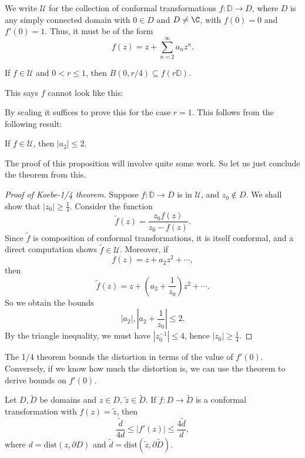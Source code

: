 \documentclass[a4paper]{article}
\renewcommand\D{\mathbb{D}}
\newcommand\dist{\mathrm{dist}}
\begin{document}
We write $\mathcal{U}$ for the collection of conformal transformations $f: \D \to D$, where $D$ is any simply connected domain with $0 \in D$ and $D \not= \C$, with $f(0) = 0$ and $f'(0) = 1$. Thus, it must be of the form
\[
  f(z) = z + \sum_{n = 2}^\infty a_n z^n.
\]
\begin{thm}
  If $f \in \mathcal{U}$ and $0 < r \leq 1$, then $B(0, r/4) \subseteq f(r\D)$.
\end{thm}
This says $f$ cannot look like this:
\begin{center}
\end{center}
By scaling it suffices to prove this for the case $r = 1$. This follows from the following result:
\begin{thm}
  If $f \in \mathcal{U}$, then $|a_2| \leq 2$.
\end{thm}
The proof of this proposition will involve quite some work. So let us just conclude the theorem from this.
\begin{proof}[Proof of Koebe-1/4 theorem]
  Suppose $f: \D \to D$ is in $\mathcal{U}$, and $z_0 \not \in D$. We shall show that $|z_0| \geq \frac{1}{4}$. Consider the function
  \[
    \tilde{f}(z) = \frac{z_0 f(z)}{z_0 - f(z)}.
  \]
  Since $\tilde{f}$ is composition of conformal transformations, it is itself conformal, and a direct computation shows $\tilde{f} \in \mathcal{U}$. Moreover, if
  \[
    f(z) = z + a_2 z^2 + \cdots,
  \]
  then
  \[
    \tilde{f}(z) = z + \left(a_2 + \frac{1}{z_0}\right)z^2 + \cdots.
  \]
  So we obtain the bounds
  \[
    |a_2|, \left|a_2 + \frac{1}{z_0}\right| \leq 2.
  \]
  By the triangle inequality, we must have $|z_0^{-1}| \leq 4$, hence $|z_0| \geq \frac{1}{4}$.
\end{proof}

The 1/4 theorem bounds the distortion in terms of the value of $f'(0)$. Conversely, if we know how much the distortion is, we can use the theorem to derive bounds on $f'(0)$.
\begin{cor}
  Let $D, \tilde{D}$ be domains and $z \in D$, $\tilde{z} \in \tilde{D}$. If $f: D \to \tilde{D}$ is a conformal transformation with $f(z) = \tilde{z}$, then
  \[
    \frac{\tilde{d}}{4d} \leq |f'(z)| \leq \frac{4\tilde{d}}{d},
  \]
  where $d = \dist(z, \partial D)$ and $\tilde{d} = \dist(\tilde{z}, \partial \tilde{D})$.
\end{cor}
\end{document}
